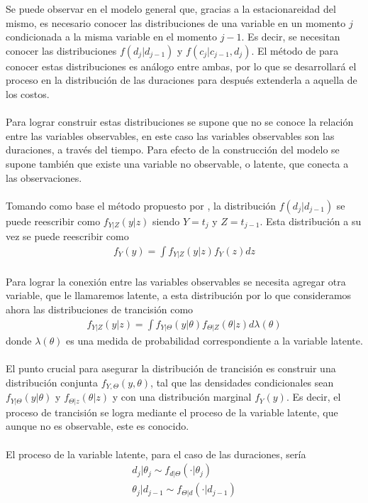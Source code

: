 Se puede observar en el modelo general que, gracias a la estacionareidad del mismo, es necesario conocer las distribuciones de una variable en un momento $j$ condicionada a la misma variable en el momento $j-1$. Es decir, se necesitan conocer las distribuciones $f(d_j|d_{j-1})$ y $f(c_j|c_{j-1},d_j)$. El m\'etodo de para conocer estas distribuciones es an\'alogo entre ambas, por lo que se desarrollar\'a el proceso en la distribuci\'on de las duraciones para despu\'es extenderla a aquella de los costos.\\
\\
Para lograr construir estas distribuciones se supone que no se conoce la relaci\'on entre las variables observables, en este caso las variables observables son las duraciones, a trav\'es del tiempo. Para efecto de la construcci\'on del modelo se supone tambi\'en que existe una variable no observable, o latente, que conecta a las observaciones.\\
\\
Tomando como base el m\'etodo propuesto por \cite{pitt2002constructing}, la distribuci\'on $f(d_j|d_{j-1})$ se puede reescribir como $f_{Y|Z}(y|z)$ siendo $Y=t_j$ y $Z=t_{j-1}$. Esta distribuci\'on a su vez se puede reescribir como
\begin{align*}
f_Y(y)=\int f_{Y|Z}(y|z)f_Y(z)dz
\end{align*}
\\
Para lograr la conexi\'on entre las variables observables se necesita agregar otra variable, que le llamaremos latente, a esta distribuci\'on por lo que consideramos ahora las distribuciones de trancisi\'on como
\begin{align*}
f_{Y|Z}(y|z)=\int f_{Y|\Theta}(y|\theta)f_{\Theta|Z}(\theta|z)d\lambda(\theta)
\end{align*}
donde $\lambda(\theta)$ es una medida de probabilidad correspondiente a la variable latente.\\
\\
El punto crucial para asegurar la distribuci\'on de trancisi\'on es construir una distribuci\'on conjunta $f_{Y,\Theta}(y,\theta)$, tal que las densidades condicionales sean $f_{Y|\Theta}(y|\theta)$ y $f_{\Theta|z}(\theta|z)$ y con una distribuci\'on marginal $f_Y(y)$. Es decir, el proceso de trancisi\'on se logra mediante el proceso de la variable latente, que aunque no es observable, este es conocido.\\
\\
El proceso de la variable latente, para el caso de las duraciones, ser\'ia
\begin{align*}
d_{j}|\theta_j \sim f_{d|\Theta}(\cdot|\theta_j)\\
\theta_j|d_{j-1} \sim f_{\Theta|d}(\cdot|d_{j-1})
\end{align*}
